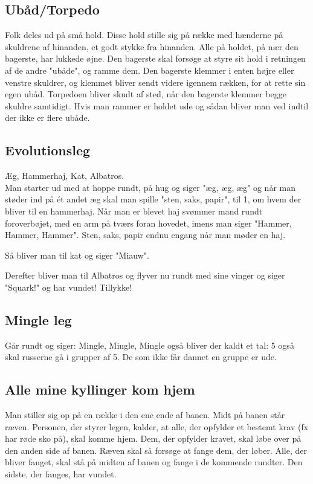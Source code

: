 \documentclass[../../main.tex]{subfiles}
\begin{document}
\begin{multicols}{2}
\subsection*{Ubåd/Torpedo}
    Folk deles ud på små hold. Disse hold stille sig på række med hænderne på skuldrene af hinanden, et godt stykke fra hinanden. Alle på holdet, på nær den bagerste, har lukkede øjne. Den bagerste skal forsøge at styre sit hold i retningen af de andre "ubåde", og ramme dem. Den bagerste klemmer i enten højre eller venstre skuldrer, og klemmet bliver sendt videre igennem rækken, for at rette sin egen ubåd. Torpedoen bliver skudt af sted, når den bagerste klemmer begge skuldre samtidigt. Hvis man rammer er holdet ude og sådan bliver man ved indtil der ikke er flere ubåde. 

\subsection*{Evolutionsleg}
    Æg, Hammerhaj, Kat, Albatros.\\
    Man starter ud med at hoppe rundt, på hug og siger "æg, æg, æg" og når man støder ind på ét andet æg skal man spille "sten, saks, papir", til 1, om hvem der bliver til en hammerhaj. Når man er blevet haj svømmer mand rundt foroverbøjet, med en arm på tværs foran hovedet, imens man siger "Hammer, Hammer, Hammer". Sten, saks, papir endnu engang når man møder en haj. 

    Så bliver man til kat og siger "Miauw". 
    
    Derefter bliver man til Albatros og flyver nu rundt med sine vinger og siger "Squark!" og har vundet! Tillykke!

\subsection*{Mingle leg}
    Går rundt og siger: Mingle, Mingle, Mingle også bliver der kaldt et tal: 5 også skal russerne gå i grupper af 5. De som ikke får dannet en gruppe er ude.

\subsection*{Alle mine kyllinger kom hjem}
    Man stiller sig op på en række i den ene ende af banen. Midt på banen står ræven. Personen, der styrer legen, kalder, at alle, der opfylder et bestemt krav (fx har røde sko på), skal komme hjem. Dem, der opfylder kravet, skal løbe over på den anden side af banen. Ræven skal så forsøge at fange dem, der løber. Alle, der bliver fanget, skal stå på midten af banen og fange i de kommende rundter. Den sidste, der fanges, har vundet.


\end{multicols}
\end{document}
